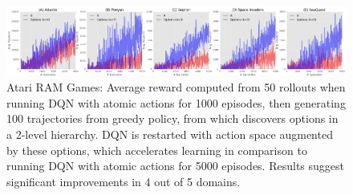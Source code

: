 \begin{figure}[ht!]
    \centering
    \includegraphics[width=\textwidth]{ddco-experiments/exp5-atari.png}
    \caption{Atari RAM Games: Average reward computed from 50 rollouts when running DQN with atomic actions for 1000 episodes, then generating 100 trajectories from greedy policy, from which \alg discovers options in a 2-level hierarchy. DQN is restarted with action space augmented by these options, which accelerates learning in comparison to running DQN with atomic actions for 5000 episodes. Results suggest significant improvements in 4 out of 5 domains. \label{atari-1}}
\end{figure}

